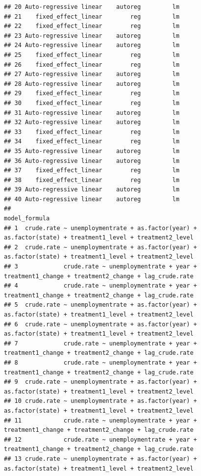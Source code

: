 \documentclass[
]{article}
\begin{document}
\begin{verbatim}
## 20 Auto-regressive linear    autoreg         lm
## 21    fixed_effect_linear        reg         lm
## 22    fixed_effect_linear        reg         lm
## 23 Auto-regressive linear    autoreg         lm
## 24 Auto-regressive linear    autoreg         lm
## 25    fixed_effect_linear        reg         lm
## 26    fixed_effect_linear        reg         lm
## 27 Auto-regressive linear    autoreg         lm
## 28 Auto-regressive linear    autoreg         lm
## 29    fixed_effect_linear        reg         lm
## 30    fixed_effect_linear        reg         lm
## 31 Auto-regressive linear    autoreg         lm
## 32 Auto-regressive linear    autoreg         lm
## 33    fixed_effect_linear        reg         lm
## 34    fixed_effect_linear        reg         lm
## 35 Auto-regressive linear    autoreg         lm
## 36 Auto-regressive linear    autoreg         lm
## 37    fixed_effect_linear        reg         lm
## 38    fixed_effect_linear        reg         lm
## 39 Auto-regressive linear    autoreg         lm
## 40 Auto-regressive linear    autoreg         lm
##                                                                                               model_formula
## 1  crude.rate ~ unemploymentrate + as.factor(year) + as.factor(state) + treatment1_level + treatment2_level
## 2  crude.rate ~ unemploymentrate + as.factor(year) + as.factor(state) + treatment1_level + treatment2_level
## 3             crude.rate ~ unemploymentrate + year + treatment1_change + treatment2_change + lag_crude.rate
## 4             crude.rate ~ unemploymentrate + year + treatment1_change + treatment2_change + lag_crude.rate
## 5  crude.rate ~ unemploymentrate + as.factor(year) + as.factor(state) + treatment1_level + treatment2_level
## 6  crude.rate ~ unemploymentrate + as.factor(year) + as.factor(state) + treatment1_level + treatment2_level
## 7             crude.rate ~ unemploymentrate + year + treatment1_change + treatment2_change + lag_crude.rate
## 8             crude.rate ~ unemploymentrate + year + treatment1_change + treatment2_change + lag_crude.rate
## 9  crude.rate ~ unemploymentrate + as.factor(year) + as.factor(state) + treatment1_level + treatment2_level
## 10 crude.rate ~ unemploymentrate + as.factor(year) + as.factor(state) + treatment1_level + treatment2_level
## 11            crude.rate ~ unemploymentrate + year + treatment1_change + treatment2_change + lag_crude.rate
## 12            crude.rate ~ unemploymentrate + year + treatment1_change + treatment2_change + lag_crude.rate
## 13 crude.rate ~ unemploymentrate + as.factor(year) + as.factor(state) + treatment1_level + treatment2_level

\end{verbatim}
\end{document}
